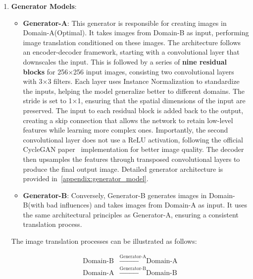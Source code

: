 \documentclass[12pt,DIV14,BCOR12mm,a4paper,footinclude=false,headinclude,parskip=half-,twoside,openright,cleardoublepage=empty,toc=index,bibliography=totoc,listof=totoc]{scrreprt}
\numberwithin{equation}{chapter}
\begin{document}
\begin{enumerate}
    \item \textbf{Generator Models}:
    \begin{itemize}
        \item \textbf{Generator-A}: This generator is responsible for creating images in Domain-A(Optimal). It takes images from Domain-B as input, performing image translation conditioned on these images. The architecture follows an encoder-decoder framework, starting with a convolutional layer that downscales the input. This is followed by a series of \textbf{nine residual blocks} for 256×256 input images, consisting two convolutional layers with 3×3 filters. Each layer uses Instance Normalization to standardize the inputs, helping the model generalize better to different domains. The stride is set to 1×1, ensuring that the spatial dimensions of the input are preserved. The input to each residual block is added back to the output, creating a skip connection that allows the network to retain low-level features while learning more complex ones. Importantly, the second convolutional layer does not use a ReLU activation, following the official CycleGAN paper~\cite{zhu2017unpaired} implementation for better image quality. The decoder then upsamples the features through transposed convolutional layers to produce the final output image. Detailed generator architecture is provided in~\ref{appendix:generator_model}.
        \item \textbf{Generator-B}: Conversely, Generator-B generates images in Domain-B(with bad influences) and takes images from Domain-A as input. It uses the same architectural principles as Generator-A, ensuring a consistent translation process.
    \end{itemize}

    The image translation processes can be illustrated as follows:

    \begin{align*}
    \text{Domain-B} & \xrightarrow{\text{Generator-A}} \text{Domain-A} \\
    \text{Domain-A} & \xrightarrow{\text{Generator-B}} \text{Domain-B}
    \end{align*}


\end{enumerate}
\end{document}
